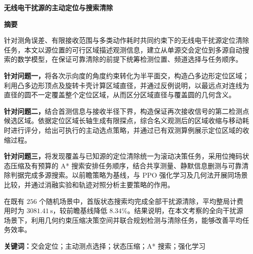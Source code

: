 \thispagestyle{empty}
\begin{center}
{\fontsize{16pt}{20pt}\selectfont\bfseries 无线电干扰源的主动定位与搜索清除\par}
\vspace{5pt}
\end{center}
\vspace{12pt}
\begin{center}
{\fontsize{14pt}{17pt}\selectfont\bfseries 摘\quad 要\par}
\end{center}
\vspace{4pt}

针对测角误差、有限接收范围与多类动作耗时共同约束下的无线电干扰源定位清除任务，本文以源位置的可行区域描述观测信息，建立从单源交会定位到多源自动搜索的数学模型，在保证可靠清除的前提下统筹检测位置、频道选择与任务顺序。

\textbf{针对问题一，}将各次示向度的角度约束转化为半平面交，构造凸多边形定位区域；利用凸多边形顶点及旋转卡壳计算区域直径，并通过反例说明，以最远点对连线为直径的圆不一定覆盖整个定位区域，从而区分区域直径与覆盖圆的几何含义。

\textbf{针对问题二，}结合首测信息与接收半径下界，构造保证再次接收信号的第二检测点候选区域。依据定位区域长轴生成有限探点，综合名义观测后的区域收缩与移动耗时进行评分，给出可执行的主动选点策略，并通过已有双测算例展示定位区域的收缩过程。

\textbf{针对问题三，}将发现覆盖与已知源的定位清除统一为滚动决策任务，采用位掩码状态压缩及有预算的 A* 搜索安排任务顺序，结合共享测量、静默信息删测与可靠清除判据完成多源搜索。以前瞻策略为基线，与 PPO 强化学习及几何法开展同场景比较，并通过消融实验和轨迹对照分析主要策略的作用。

在既有 $256$ 个随机场景中，首版状态搜索均完成全部干扰源清除，平均整局计费用时为 $3081.41\,\mathrm{s}$，较前瞻基线降低 $8.34\%$。结果说明，在本文考察的全向干扰源场景下，利用几何约束压缩决策空间并联合规划检测与清除任务，能够改善平均任务效率。

\vspace{12pt}
\noindent\textbf{关键词：}交会定位；主动测点选择；状态压缩；A* 搜索；强化学习

